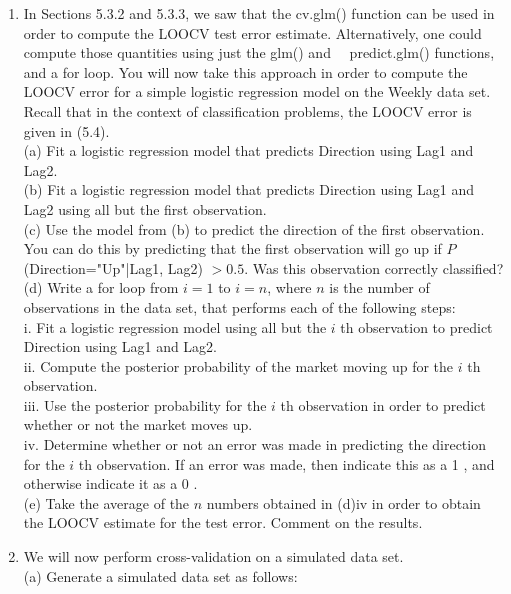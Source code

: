\documentclass[10pt]{article}
\begin{document}
\begin{enumerate}
(a) Using the summary() and glm() functions, determine the estimated standard errors for the coefficients associated with income and balance in a multiple logistic regression model that uses both predictors.\\
(b) Write a function, boot.fn(), that takes as input the Default data set as well as an index of the observations, and that outputs the coefficient estimates for income and balance in the multiple logistic regression model.\\
(c) Use the boot() function together with your boot.fn() function to estimate the standard errors of the logistic regression coefficients for income and balance.\\
(d) Comment on the estimated standard errors obtained using the glm() function and using your bootstrap function.
  \item In Sections 5.3.2 and 5.3.3, we saw that the cv.glm() function can be used in order to compute the LOOCV test error estimate. Alternatively, one could compute those quantities using just the glm() and\
\
predict.glm() functions, and a for loop. You will now take this approach in order to compute the LOOCV error for a simple logistic regression model on the Weekly data set. Recall that in the context of classification problems, the LOOCV error is given in (5.4).\\
(a) Fit a logistic regression model that predicts Direction using Lag1 and Lag2.\\
(b) Fit a logistic regression model that predicts Direction using Lag1 and Lag2 using all but the first observation.\\
(c) Use the model from (b) to predict the direction of the first observation. You can do this by predicting that the first observation will go up if $P$ (Direction="Up"|Lag1, Lag2) $>0.5$. Was this observation correctly classified?\\
(d) Write a for loop from $i=1$ to $i=n$, where $n$ is the number of observations in the data set, that performs each of the following steps:\\
i. Fit a logistic regression model using all but the $i$ th observation to predict Direction using Lag1 and Lag2.\\
ii. Compute the posterior probability of the market moving up for the $i$ th observation.\\
iii. Use the posterior probability for the $i$ th observation in order to predict whether or not the market moves up.\\
iv. Determine whether or not an error was made in predicting the direction for the $i$ th observation. If an error was made, then indicate this as a 1 , and otherwise indicate it as a 0 .\\
(e) Take the average of the $n$ numbers obtained in (d)iv in order to obtain the LOOCV estimate for the test error. Comment on the results.
  \item We will now perform cross-validation on a simulated data set.\\
(a) Generate a simulated data set as follows:
\end{enumerate}
\end{document}
